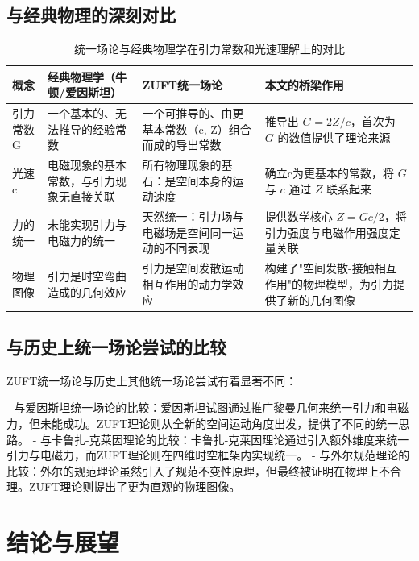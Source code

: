 \documentclass[12pt,a4paper]{article}
\begin{document}
\subsection{与经典物理的深刻对比}
\label{subsection:comparison_classical_physics}

\begin{table}[H]
\centering
\caption{统一场论与经典物理学在引力常数和光速理解上的对比}
\label{table:comparison_classical_physics}
\begin{tabular}{|l|l|l|l|}
\hline
\textbf{概念} & \textbf{经典物理学（牛顿/爱因斯坦）} & \textbf{ZUFT统一场论} & \textbf{本文的桥梁作用} \\
\hline
引力常数G & 一个基本的、无法推导的经验常数 & 一个可推导的、由更基本常数（c, Z）组合而成的导出常数 & 推导出 $G = 2Z/c$，首次为 $G$ 的数值提供了理论来源 \\
光速c & 电磁现象的基本常数，与引力现象无直接关联 & 所有物理现象的基石：是空间本身的运动速度 & 确立c为更基本的常数，将 $G$ 与 $c$ 通过 $Z$ 联系起来 \\
力的统一 & 未能实现引力与电磁力的统一 & 天然统一：引力场与电磁场是空间同一运动的不同表现 & 提供数学核心 $Z = G c/2$，将引力强度与电磁作用强度定量关联 \\
物理图像 & 引力是时空弯曲造成的几何效应 & 引力是空间发散运动相互作用的动力学效应 & 构建了"空间发散-接触相互作用"的物理模型，为引力提供了新的几何图像 \\
\hline
\end{tabular}
\end{table}

\subsection{与历史上统一场论尝试的比较}
\label{subsection:comparison_unified_theories}

ZUFT统一场论与历史上其他统一场论尝试有着显著不同：

- 与爱因斯坦统一场论的比较：爱因斯坦试图通过推广黎曼几何来统一引力和电磁力，但未能成功。ZUFT理论则从全新的空间运动角度出发，提供了不同的统一思路。
- 与卡鲁扎-克莱因理论的比较：卡鲁扎-克莱因理论通过引入额外维度来统一引力与电磁力，而ZUFT理论则在四维时空框架内实现统一。
- 与外尔规范理论的比较：外尔的规范理论虽然引入了规范不变性原理，但最终被证明在物理上不合理。ZUFT理论则提出了更为直观的物理图像。

\section{结论与展望}
\label{section:conclusion_future}
\end{document}
